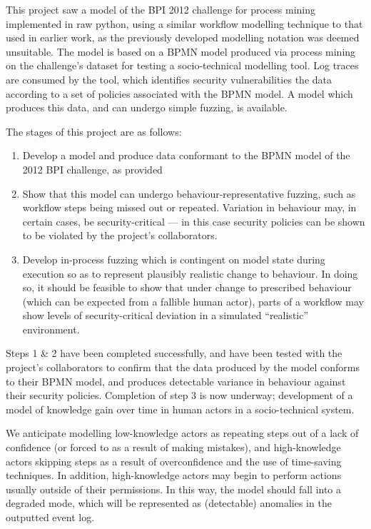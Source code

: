 \documentclass[11pt]{article}
\newcommand{\ampersand}{\&}
\begin{document}
This project saw a model of the BPI 2012 challenge for process mining
implemented in raw python, using a similar workflow modelling technique to that
used in earlier work\cite{pdsf_paper}, as the previously developed modelling
notation was deemed unsuitable. The model is based on a BPMN model produced via
process mining on the challenge's dataset\cite{van3536bpi} for testing a
socio-technical modelling tool. Log traces are consumed by the tool, which
identifies security vulnerabilities the data according to a set of policies
associated with the BPMN model. A model which produces this data, and can
undergo simple fuzzing, is available\cite{bpi_model_repo}.

The stages of this project are as follows:

\begin{enumerate}
\item Develop a model and produce data conformant to the BPMN model of the 2012 BPI
challenge, as provided
\item Show that this model can undergo behaviour-representative fuzzing, such as
workflow steps being missed out or repeated. Variation in behaviour may,
in certain cases, be security-critical --- in this case security policies can
be shown to be violated by the project's collaborators.
\item Develop in-process fuzzing which is contingent on model state during
execution so as to represent plausibly realistic change to behaviour. In
doing so, it should be feasible to show that under change to prescribed
behaviour (which can be expected from a fallible human actor), parts of a
workflow may show levels of security-critical deviation in a simulated
``realistic'' environment.
\end{enumerate}

Steps 1 \ampersand{} 2 have been completed successfully, and have been tested
with the project's collaborators to confirm that the data produced by the model
conforms to their BPMN model, and produces detectable variance in behaviour
against their security policies. Completion of step 3 is now underway;
development of a model of knowledge gain over time in human actors in a
socio-technical system\cite{hanakawa}.

We anticipate modelling low-knowledge actors as repeating steps out of a lack of
confidence (or forced to as a result of making mistakes), and high-knowledge
actors skipping steps as a result of overconfidence and the use of time-saving
techniques. In addition, high-knowledge actors may begin to perform actions
usually outside of their permissions. In this way, the model should fall into a
degraded mode\cite{degraded_modes}, which will be represented as (detectable)
anomalies in the outputted event log.
\end{document}
